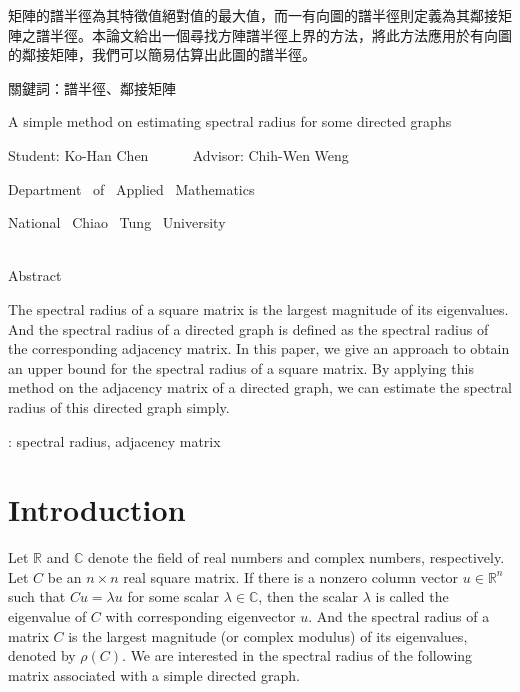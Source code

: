 \documentclass[12pt, a4paper]{article}
\theoremstyle{plain}
\theoremstyle{definition}
\begin{document}
 矩陣的譜半徑為其特徵值絕對值的最大值，而一有向圖的譜半徑則定義為其鄰接矩陣之譜半徑。本論文給出一個尋找方陣譜半徑上界的方法，將此方法應用於有向圖的鄰接矩陣，我們可以簡易估算出此圖的譜半徑。
 \\
\bigskip

\noindent 關鍵詞：譜半徑、鄰接矩陣
\pagebreak



\begin{center}{\LARGE
A simple method on estimating spectral radius for some directed graphs
\bigskip\bigskip\bigskip}

{ \large
Student: Ko-Han Chen  ~~~~~ Advisor: Chih-Wen Weng \\
\Large

Department ~of~ Applied ~Mathematics
\bigskip

National~ Chiao ~Tung~ University
\bigskip\bigskip\bigskip\bigskip}\\
{\large Abstract}
\end{center}

The spectral radius of a square matrix is the largest magnitude of its eigenvalues. And the spectral radius of a directed graph is defined as the spectral radius of the corresponding adjacency matrix. In this paper, we give an approach to obtain an upper bound for the spectral radius of a square matrix. By applying this method on the adjacency matrix of a directed graph, we can estimate the spectral radius of this directed graph simply.

\bigskip


: spectral radius, adjacency matrix
\pagebreak


\renewcommand{\baselinestretch}{1.2}
\large
\tableofcontents


\clearpage
{}
\linespread{1.5}

\setcounter{page}{1}
\section{Introduction}

Let $\mathbb{R}$ and $\mathbb{C}$ denote the field of real numbers and complex numbers, respectively. Let $C$ be an $n\times n$ real square matrix. If there is a nonzero column vector $u\in\mathbb{R}^n$ such that $Cu=\lambda u$ for some scalar $\lambda\in\mathbb{C}$, then the scalar $\lambda$ is called the eigenvalue of $C$ with corresponding eigenvector $u$. And the spectral radius of a matrix $C$ is the largest magnitude (or complex modulus) of its eigenvalues, denoted by $\rho(C)$. We are interested in the spectral radius of the following matrix associated with a simple directed graph.
\end{document}
